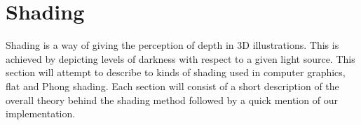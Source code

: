 \section{Shading}

Shading is a way of giving the perception of depth in 3D illustrations.
This is achieved by depicting levels of darkness with respect to a given
light source. This section will attempt to describe to kinds of shading used
in computer graphics, flat and Phong shading. Each section will consist of a
short description of the overall theory behind the shading method followed by a
quick mention of our implementation.




